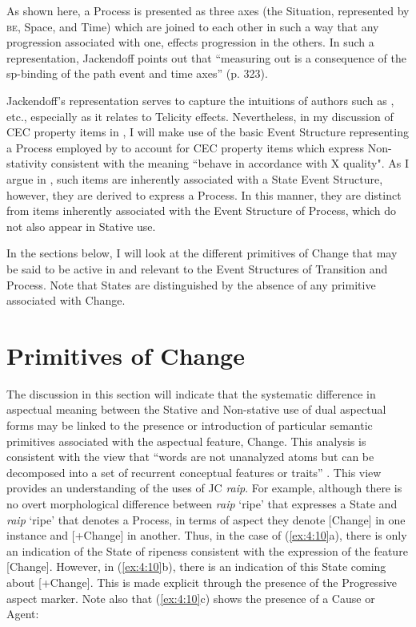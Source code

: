 As shown here, a Process is presented as three axes (the Situation,
represented by \textsc{be}, Space, and Time) which are joined to each other in
such a way that any progression associated with one, effects
progression in the others.  In such a representation, Jackendoff
points out that “measuring out is a consequence of the sp-binding of
the path event and time axes” (p. 323).

Jackendoff’s representation serves to capture the intuitions of
authors such as \citet{Pustejovsky1991,Krifka1998},
\citet{Tenny1994,Verkuyl1993} etc., especially as it relates
to Telicity effects.  Nevertheless, in my discussion of CEC property
items in , I will make use of the basic Event Structure
representing a Process employed by \citet{Pustejovsky1991} to account
for CEC property items which express Non-stativity consistent with the
meaning ``behave in accordance with X quality".  As I argue in
, such items are inherently associated with a State
Event Structure, however, they are derived to express a Process.  In
this manner, they are distinct from items inherently associated with
the Event Structure of Process, which do not also appear in Stative
use.

In the sections below, I will look at the different primitives of
Change that may be said to be active in and relevant to the Event
Structures of Transition and Process.  Note that States are
distinguished by the absence of any primitive associated with Change.

\section{Primitives of Change}\label{sec:4.3}

The discussion in this section will indicate that the systematic
difference in aspectual meaning between the Stative and Non-stative
use of dual aspectual forms may be linked to the presence or
introduction of particular semantic primitives associated with the
aspectual feature, Change.  This analysis is consistent with the view
that “words are not unanalyzed atoms but can be decomposed into a set
of recurrent conceptual features or traits” \citep[350]{ChierchiaMcConnell-Ginet1992}.  
This view provides an understanding of the uses of JC \textit{raip}.  
For example, although there is no overt morphological difference between \textit{raip}
`ripe' that expresses a State and \textit{raip} `ripe' that denotes a
Process, in terms of aspect they denote [\textminus Change] in one instance and
[+Change] in another.  Thus, in the case of (\ref{ex:4:10}a), there is
only an indication of the State of ripeness consistent with the
expression of the feature [\textminus Change].  However, in (\ref{ex:4:10}b),
there is an indication of this State coming about [+Change].  This is
made explicit through the presence of the Progressive aspect marker.
Note also that (\ref{ex:4:10}c) shows the presence of a Cause or
Agent:

